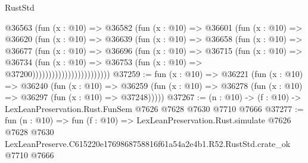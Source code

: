 \begin{lexlean}{RustStd}
\begin{coremodule}
                            @36563
                              (fun (x : @10) =>
                              @36582
                                (fun (x : @10) =>
                                @36601
                                  (fun (x : @10) =>
                                  @36620
                                    (fun (x : @10) =>
                                    @36639
                                      (fun (x : @10) =>
                                      @36658
                                        (fun (x : @10) =>
                                        @36677
                                          (fun (x : @10) =>
                                          @36696
                                            (fun (x : @10) =>
                                            @36715
                                              (fun (x : @10) =>
                                              @36734
                                                (fun (x : @10) =>
                                                @36753
                                                  (fun (x : @10) => @37200))))))))))))))))))))))))
@37259 := fun (x : @10) =>
  @36221
    (fun (x : @10) =>
    @36240
      (fun (x : @10) =>
      @36259 (fun (x : @10) => @36278 (fun (x : @10) => @36297 (fun (x : @10) => @37248)))))
@37267 := (n : @10) -> (f : @10) -> LexLeanPreservation.Rust.FunSem @7626 @7628 @7630 @7710 @7666
@37277 := fun (n : @10) =>
  fun (f : @10) =>
  LexLeanPreservation.Rust.simulate
    @7626
    @7628
    @7630
    LexLeanPreserve.C615220e1769868758816f61a54a2e4b1.R52.RustStd.crate_ok
    @7710
    @7666
\end{coremodule}
\end{lexlean}
